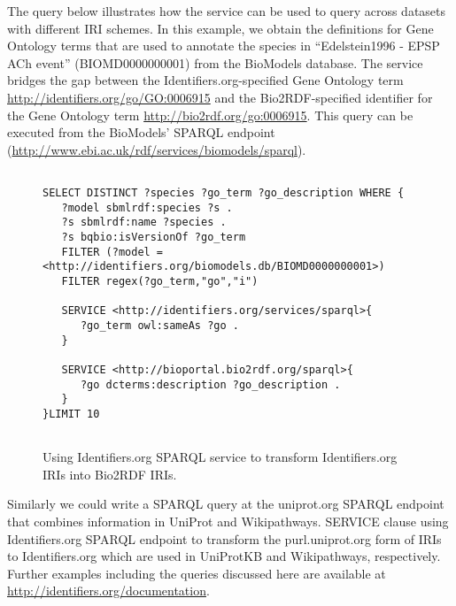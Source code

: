 \documentclass{bioinfo}
\begin{document}
The query below illustrates how the service can be used to query across datasets with different IRI schemes. In this example, we obtain the definitions for Gene Ontology terms that are used to annotate the species in ``Edelstein1996 - EPSP ACh event'' (BIOMD0000000001) from the BioModels database. The service bridges the gap between the Identifiers.org-specified Gene Ontology term \href{http://identifiers.org/go/GO:0006915}{http://identifiers.org/go/GO:0006915} and the Bio2RDF-specified identifier for the Gene Ontology term \href{http://bio2rdf.org/go:0006915} {http://bio2rdf.org/go:0006915}. This query can be executed from the BioModels' SPARQL endpoint (\href{http://www.ebi.ac.uk/rdf/services/biomodels/sparql}{http://www.ebi.ac.uk/rdf/services/biomodels/sparql}).

\begin{figure}[h]
{\scriptsize
\begin{verbatim}

SELECT DISTINCT ?species ?go_term ?go_description WHERE {
   ?model sbmlrdf:species ?s . 
   ?s sbmlrdf:name ?species .
   ?s bqbio:isVersionOf ?go_term 
   FILTER (?model = <http://identifiers.org/biomodels.db/BIOMD0000000001>)
   FILTER regex(?go_term,"go","i")

   SERVICE <http://identifiers.org/services/sparql>{
      ?go_term owl:sameAs ?go .
   }

   SERVICE <http://bioportal.bio2rdf.org/sparql>{
      ?go dcterms:description ?go_description .
   }
}LIMIT 10


\end{verbatim}
}
\caption{Using Identifiers.org SPARQL service to transform Identifiers.org IRIs into Bio2RDF IRIs.}
\label{translatestuff}
\end{figure}

Similarly we could write a SPARQL query at the uniprot.org SPARQL endpoint that combines information in UniProt and Wikipathways. SERVICE clause using Identifiers.org SPARQL endpoint to transform the purl.uniprot.org form of IRIs to Identifiers.org which are used in UniProtKB and Wikipathways, respectively. Further examples including the queries discussed here are available at \href{http://identifiers.org/documentation}{http://identifiers.org/documentation}.
\end{document}
